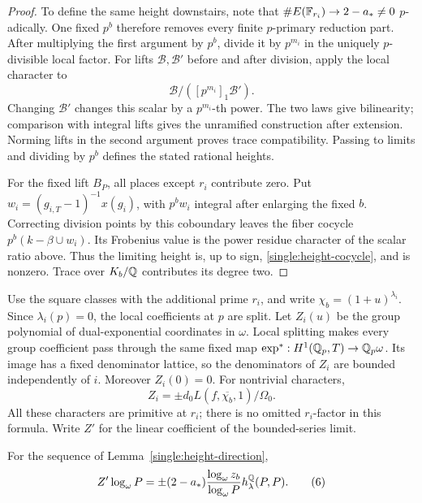 \begin{proof}
To define the same height downstairs, note that
\(\#E(\mathbb F_{r_i})\to2-a_*\ne0\) \(p\)-adically.  One fixed
\(p^b\) therefore removes every finite \(p\)-primary reduction
part.  After multiplying the first argument by \(p^b\), divide
it by \(p^{m_i}\) in the uniquely \(p\)-divisible local factor.
For lifts \(\mathcal B,\mathcal B'\) before and after division,
apply the local character to
\[
                    \mathcal B/([p^{m_i}]_1\mathcal B').
\]
Changing \(\mathcal B'\) changes this scalar by a
\(p^{m_i}\)-th power.  The two laws give bilinearity; comparison
with integral lifts gives the unramified construction after
extension.  Norming lifts in the second argument proves trace
compatibility.  Passing to limits and dividing by \(p^b\)
defines the stated rational heights.

For the fixed lift \(B_P\), all places except \(r_i\) contribute
zero.  Put \(w_i=(g_{i,T}-1)^{-1}x(g_i)\), with \(p^bw_i\)
integral after enlarging the fixed \(b\).  Correcting division
points by this coboundary leaves the fiber cocycle
\(p^b(k-\beta\cup w_i)\).  Its Frobenius value is the power
residue character of the scalar ratio above.  Thus the limiting
height is, up to sign, \eqref{single:height-cocycle}, and is
nonzero.  Trace over \(K_b/\mathbb Q\) contributes its degree two.
\end{proof}

Use the square classes with the additional prime \(r_i\), and
write \(\chi_b=(1+u)^{\lambda_i}\).  Since \(\lambda_i(p)=0\),
the local coefficients at \(p\) are split.  Let \(Z_i(u)\) be
the group polynomial of dual-exponential coordinates in
\(\omega\).  Local splitting makes every group coefficient
pass through the same fixed map
\(\exp^*:H^1(\mathbb Q_p,T)\to\mathbb Q_p\omega\).  Its image has a
fixed denominator lattice, so the denominators of \(Z_i\)
are bounded independently of \(i\).  Moreover \(Z_i(0)=0\).
For nontrivial characters,
\[
              Z_i=\pm d_0 L(f,\overline{\chi_b},1)/\Omega_0.
\]
All these characters are primitive at \(r_i\); there is no
omitted \(r_i\)-factor in this formula.  Write \(Z'\) for the
linear coefficient of the bounded-series limit.

\begin{lemma}\label{single:cup}
For the sequence of Lemma~\ref{single:height-direction},
\begin{equation}
 Z'\log_\omega P
  =\pm(2-a_*)\frac{\log_\omega z_b}{\log_\omega P}
                        h_\lambda^\mathbb Q(P,P).
 \tag{6}\label{eq:source-6}
\end{equation}
\end{lemma}

